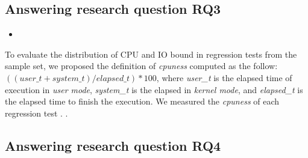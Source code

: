 \subsection{Answering research question RQ3}
\label{sec:rqThree}

\begin{itemize}
    \item \RQB
\end{itemize}

To evaluate the distribution of CPU and IO bound in regression tests
from the sample set, we proposed the definition of \emph{cpuness}
computed as the follow: $((user\_t + system\_t) / elapsed\_t) * 100$,
where \emph{user\_t} is the elapsed time of execution in \emph{user
mode}, \emph{system\_t} is the elapsed in \emph{kernel mode}, and
\emph{elapsed\_t} is the elapsed time to finish the execution. We
measured the \emph{cpuness} of each regression test  .  .  

\subsection{Answering research question RQ4}
\label{sec:rqfour}



